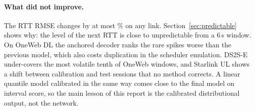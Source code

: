 \paragraph{What did not improve.} The RTT RMSE changes by at most \BSRMSEMaxAbs\% on any link. Section~\ref{sec:predictable} shows why: the level of the next RTT is close to unpredictable from a 6\,s window. On OneWeb DL the anchored decoder ranks the rare spikes worse than the previous model, which also costs duplication in the scheduler emulation. DS2S-E under-covers the most volatile tenth of OneWeb windows, and Starlink UL shows a shift between calibration and test sessions that no method corrects. A linear quantile model calibrated in the same way comes close to the final model on interval score, so the main lesson of this report is the calibrated distributional output, not the network.
